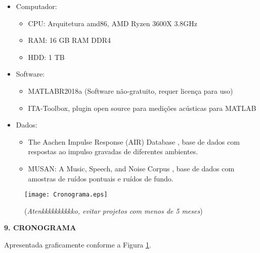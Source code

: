 \documentclass[a4paper,12pt,oneside,openany]{report}
\begin{document}
\begin{itemize}
      \item Computador:
      \begin{itemize}
            \item CPU: Arquitetura amd86, AMD Ryzen 3600X 3.8GHz
            \item RAM: 16 GB RAM DDR4
            \item HDD: 1 TB
      \end{itemize}

      \item Software:
      \begin{itemize}
            \item MATLAB\textregistered \space R2018a (Software não-gratuito, requer licença para uso)
            \item ITA-Toolbox, plugin open source para medições acústicas para MATLAB\textregistered
      \end{itemize}

      \item Dados:
      \begin{itemize}
            \item The Aachen Impulse Response (AIR) Database \cite{AIR_Database}, base de dados com respostas ao impulso
            gravadas de diferentes ambientes.
            \item MUSAN: A Music, Speech, and Noise Corpus \cite{noiseLib}, base de dados com amostras de ruídos pontuais
            e ruídos de fundo.
      \end{itemize}
\end{itemize}

\begin{figure}
      \begin{center}
      \parbox[h]{14cm}
        {
        \begin{center}
        \texttt{[image: Cronograma.eps]}
        \caption[\small{(\textit{Atenkkkkkkkkkko, evitar projetos com menos de 5 meses})}]{\label{Fig:Cronograma} \footnotesize{(\textit{Atenkkkkkkkkkko, evitar projetos com menos de 5 meses})}}
        \end{center}
        }
      \end{center}
\end{figure} 

\vspace{0.4cm}
\textbf{9. CRONOGRAMA}

Apresentada graficamente conforme a Figura \ref{Fig:Cronograma}.
\end{document}
